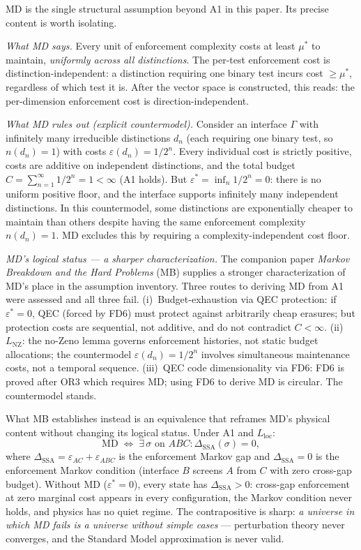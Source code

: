 \documentclass[11pt]{article}
\theoremstyle{remark}
\begin{document}
MD is the single structural assumption beyond A1 in this paper.  Its precise content is worth isolating.

\smallskip\noindent\textit{What MD says.}  Every unit of enforcement complexity costs at least $\mu^*$ to maintain, \emph{uniformly across all distinctions}.  The per-test enforcement cost is distinction-independent: a distinction requiring one binary test incurs cost $\ge \mu^*$, regardless of which test it is.  After the vector space is constructed, this reads: the per-dimension enforcement cost is direction-independent.

\smallskip\noindent\textit{What MD rules out (explicit countermodel).}  Consider an interface $\Gamma$ with infinitely many irreducible distinctions $d_n$ (each requiring one binary test, so $n(d_n) = 1$) with costs $\varepsilon(d_n) = 1/2^n$.  Every individual cost is strictly positive, costs are additive on independent distinctions, and the total budget $C = \sum_{n=1}^\infty 1/2^n = 1 < \infty$ (A1 holds).  But $\varepsilon^* = \inf_n 1/2^n = 0$: there is no uniform positive floor, and the interface supports infinitely many independent distinctions.  In this countermodel, some distinctions are exponentially cheaper to maintain than others despite having the same enforcement complexity $n(d_n) = 1$.  MD excludes this by requiring a complexity-independent cost floor.


\smallskip\noindent\textit{MD's logical status --- a sharper characterization.}
The companion paper \emph{Markov Breakdown and the Hard Problems} (MB) supplies a
stronger characterization of MD's place in the assumption inventory.  Three routes
to deriving MD from A1 were assessed and all three fail.  (i)~Budget-exhaustion
via QEC protection: if $\varepsilon^* = 0$, QEC (forced by FD6) must protect
against arbitrarily cheap erasures; but protection costs are sequential, not
additive, and do not contradict $C < \infty$.  (ii)~$L_{\mathrm{NZ}}$: the
no-Zeno lemma governs enforcement histories, not static budget allocations; the
countermodel $\varepsilon(d_n) = 1/2^n$ involves simultaneous maintenance costs,
not a temporal sequence.  (iii)~QEC code dimensionality via FD6: FD6 is proved
after OR3 which requires MD; using FD6 to derive MD is circular.  The countermodel
stands.

What MB establishes instead is an equivalence that reframes MD's physical content
without changing its logical status.  Under A1 and $L_{\mathrm{loc}}$:
\[
  \text{MD}
  \;\Longleftrightarrow\;
  \exists\,\sigma \text{ on } ABC :
  \Delta_{\mathrm{SSA}}(\sigma) = 0,
\]
where $\Delta_{\mathrm{SSA}} = \varepsilon_{AC} + \varepsilon_{ABC}$ is the
enforcement Markov gap and $\Delta_{\mathrm{SSA}} = 0$ is the enforcement Markov
condition (interface $B$ screens $A$ from $C$ with zero cross-gap budget).  Without
MD ($\varepsilon^* = 0$), every state has $\Delta_{\mathrm{SSA}} > 0$: cross-gap
enforcement at zero marginal cost appears in every configuration, the Markov
condition never holds, and physics has no quiet regime.  The contrapositive is
sharp: \emph{a universe in which MD fails is a universe without simple cases} ---
perturbation theory never converges, and the Standard Model approximation is never
valid.
\end{document}

